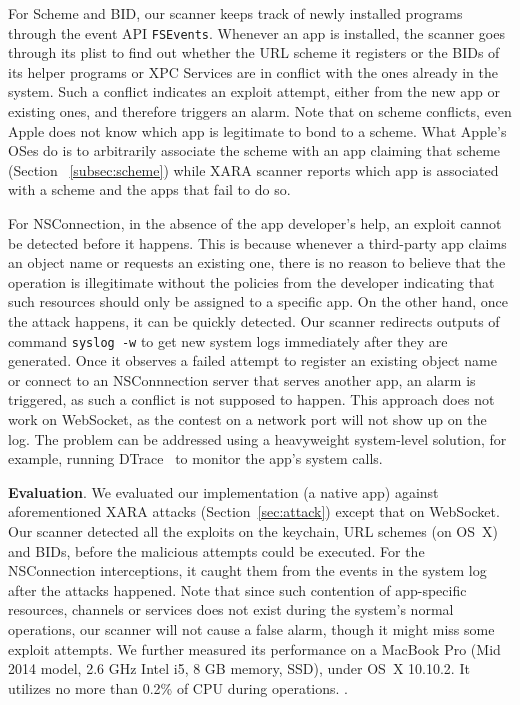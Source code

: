 \documentclass{article}
\newcommand{\ignore}[1]{}
\begin{document}
For Scheme and BID, our scanner keeps track of newly installed programs through the event API \texttt{FSEvents}. Whenever an app is installed, the scanner goes through its plist to find out whether the URL scheme it registers or the BIDs of its helper programs or XPC Services are in conflict with the ones already in the system.  Such a conflict indicates an exploit attempt, either from the new app or existing ones, and therefore triggers an alarm. Note that on scheme conflicts, even Apple does not know which app is legitimate to bond to a scheme. What Apple's OSes do is to arbitrarily associate the scheme with an app claiming that scheme (Section ~\ref{subsec:scheme}) while XARA scanner reports which app is associated with a scheme and the apps that fail to do so. 

For NSConnection, in the absence of the app developer's help, an exploit cannot be detected before it happens.  This is because whenever a third-party app claims an object name or requests an existing one, there is no reason to believe that the operation is illegitimate without the policies from the developer indicating that such resources should only be assigned to a specific app.  On the other hand, once the attack happens, it can be quickly detected. Our scanner redirects outputs of command \texttt{syslog -w} to get new system logs immediately after they are generated. Once it observes a failed attempt to register an existing object name or connect to an NSConnnection server that serves another app, an alarm is triggered, as such a conflict is not supposed to happen. This approach does not work on WebSocket, as the contest on a network port will not show up on the log.  The problem can be addressed using a heavyweight system-level solution, for example, running DTrace~\cite{DTRACE} to monitor the app's system calls.\ignore{ Such an approach, however, is very expensive and actually no more effective than our simple solution with regard to other security risks (keychain, Scheme, BID, NSConnection).  In our research, we implemented these user-land detection techniques into a native app.}

\vspace {3pt}\noindent\textbf{Evaluation}. We evaluated our implementation (a native app) against aforementioned XARA attacks (Section~\ref{sec:attack}) except that on WebSocket. Our scanner detected all the exploits on the keychain, URL schemes (on OS~X) and BIDs, before the malicious attempts could be executed.  For the NSConnection interceptions, it caught them from the events in the system log after the attacks happened. Note that since such contention of app-specific resources, channels or services does not exist during the system's normal operations, our scanner will not cause a false alarm, though it might miss some exploit attempts. We further measured its performance on a MacBook Pro (Mid 2014 model, 2.6 GHz Intel i5, 8 GB memory, SSD), under OS~X 10.10.2. It utilizes no more than 0.2\% of CPU during operations. \ignore{More details are available in Section~\ref{appendix:overhead} (see Appendix)}\ignore{,  The memory cost during operations remains almost constant at around 50 MB even with over 1,600 apps installed on the Mac. The performance overhead is also negligible, below 0.97\% during operations (Section~\ref{appendix:overhead})}.
\end{document}
